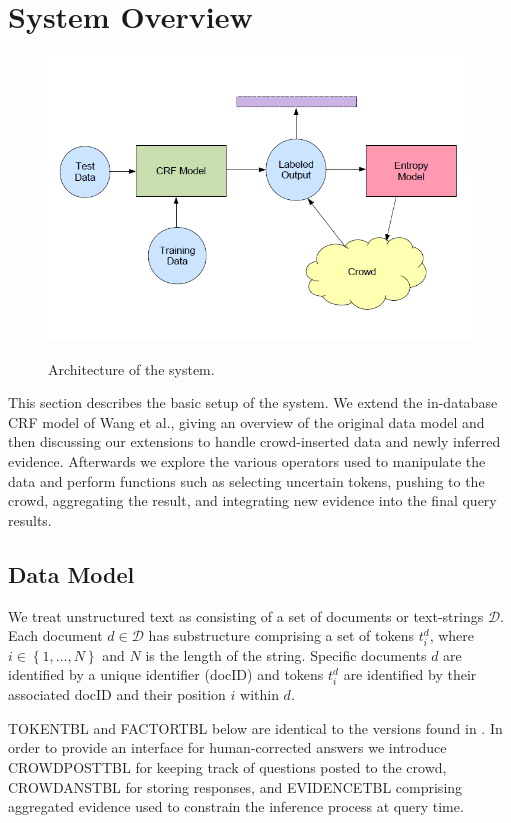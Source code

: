 \section{System Overview}

\begin{figure}[t]
		\centering
		\includegraphics[width=.65\textwidth]{images/system_design.png}
		\label{fig:system}
		\caption{Architecture of the \sysName system.} 
\end{figure}

This section describes the basic setup of the system.  We extend the in-database CRF model of Wang et al.\cite{DBLP:journals/pvldb/WangFGH10}, giving an overview of the original data model and then discussing our extensions to handle crowd-inserted data and newly inferred evidence.  Afterwards we explore the various operators used to manipulate the data and perform functions such as selecting uncertain tokens, pushing to the crowd, aggregating the result, and integrating new evidence into the final query results. 

\subsection{Data Model}

We treat unstructured text as consisting of a set of documents or text-strings $\mathcal{D}$.  Each document $d\in\mathcal{D}$ has substructure comprising a set of tokens $t^{d}_{i}$, where $i\in\left\{1,...,N\right\}$ and $N$ is the length of the string.  Specific documents $d$ are identified  by a unique identifier (docID) and tokens $t^{d}_{i}$ are identified by their associated docID and their position $i$ within $d$.

T{\small OKEN}T{\small BL} and F{\small ACTOR}T{\small BL} below are identical to the versions found in \cite{DBLP:journals/pvldb/WangFGH10}.  In order to provide an interface for human-corrected answers we introduce C{\small ROWD}P{\small OST}T{\small BL} for keeping track of questions posted to the crowd, C{\small ROWD}A{\small NS}T{\small BL} for storing responses, and E{\small VIDENCE}T{\small BL} comprising aggregated evidence used to constrain the inference process at query time.

